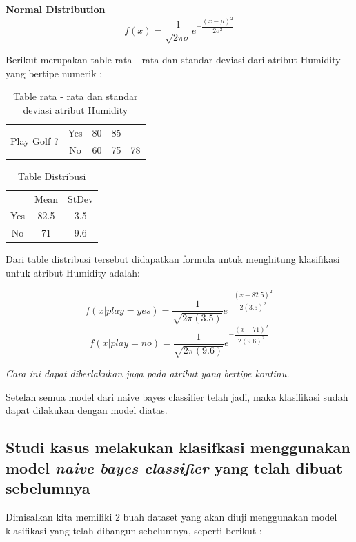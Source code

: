 		\textbf{Normal Distribution}
		\begin{equation}
			f(x) = \dfrac{1}{\sqrt{2\pi\sigma}}e^{-\dfrac{(x-\mu)^2}{2\sigma^2}}
		\end{equation}
		
		Berikut merupakan table rata - rata dan standar deviasi dari atribut Humidity yang bertipe numerik : 
		
		\begin{table}[h]
		\centering
		\caption{Table rata - rata dan standar deviasi atribut Humidity}
		\begin{tabular}{|c|c|c|c|c|}
		\toprule
		\multirow{2}{*}{Play Golf ?} & Yes & 80 & 85 & \\
		 & No & 60 & 75 & 78 \\
		\bottomrule
		\end{tabular}
		\end{table}
		
		\begin{table}[ht]
		\centering
		\caption{Table Distribusi}
		\begin{tabular}{|c|c|c|}
		\toprule
		 & Mean & StDev \\
		Yes & 82.5 & 3.5 \\
		No & 71 & 9.6 \\
		\bottomrule
		\end{tabular}
		\end{table}
		
		Dari table distribusi tersebut didapatkan formula untuk menghitung klasifikasi untuk atribut Humidity adalah:
		
		\begin{equation}
			f(x|play=yes) = \dfrac{1}{\sqrt{2\pi(3.5)}}e^{-\dfrac{(x-82.5)^2}{2(3.5)^2}}
		\end{equation}
		\begin{equation}
			f(x|play=no) = \dfrac{1}{\sqrt{2\pi(9.6)}}e^{-\dfrac{(x-71)^2}{2(9.6)^2}} 
		\end{equation}
		
		\textit{Cara ini dapat diberlakukan juga pada atribut yang bertipe kontinu.}
		
		Setelah semua model dari naive bayes classifier telah jadi, maka klasifikasi sudah dapat dilakukan dengan model diatas.

\subsection{Studi kasus melakukan klasifkasi menggunakan model \textit{naive bayes classifier} yang telah dibuat sebelumnya}
		Dimisalkan kita memiliki 2 buah dataset yang akan diuji menggunakan model klasifikasi yang telah dibangun sebelumnya, seperti berikut :
		
